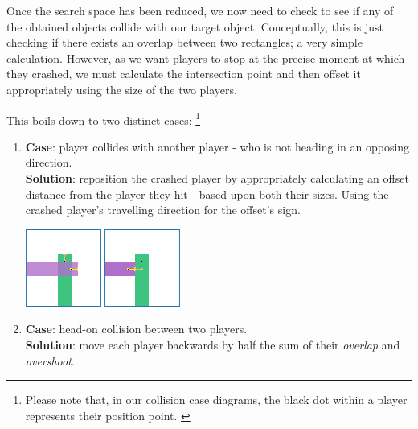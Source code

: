 \documentclass{standalone}
\begin{document}
			Once the search space has been reduced, we now need to check to see if any of the obtained objects collide with our target object. Conceptually, this is just checking if there exists an overlap between two rectangles; a very simple calculation. However, as we want players to stop at the precise moment at which they crashed, we must calculate the intersection point and then offset it appropriately using the size of the two players.

			This boils down to two distinct cases: \footnote{Please note that, in our collision case diagrams, the black dot within a player represents their position point. \label{blackDotDiagram}}
			\begin{enumerate}
    		\item
    			\textbf{Case}: player collides with another player - who is not heading in an opposing direction.\\
					\textbf{Solution}: reposition the crashed player by appropriately calculating an offset distance from the player they hit - based upon both their sizes. Using the crashed player's travelling direction for the offset's sign. \\
					\begin{minipage}{\linewidth}
						\centering
						\captionsetup{width=.8\linewidth}
	          \includegraphics[width=.8\linewidth]{resources/images/collision/side.png}%
	    		\end{minipage}
				\item \label{itm:headCollision}
					\textbf{Case}: head-on collision between two players.\\
					\textbf{Solution}: move each player backwards by half the sum of their \emph{overlap} and \emph{overshoot}.\\
					\begin{minipage}{\linewidth}

\end{minipage}
\end{enumerate}
\end{document}
